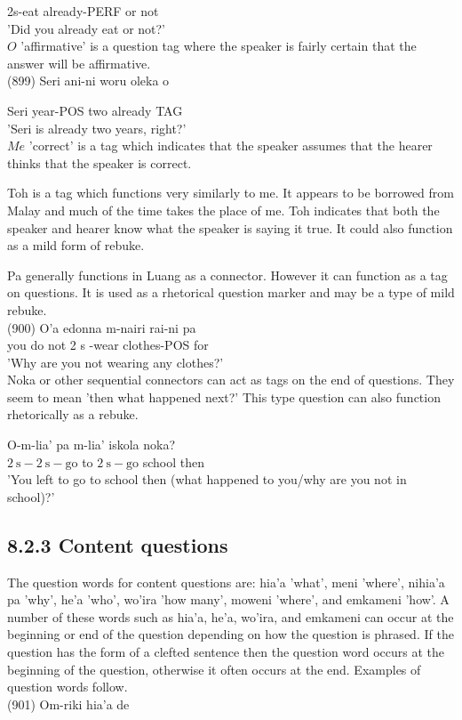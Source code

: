 \documentclass[10pt]{article}
\begin{document}
2s-eat already-PERF or not\\
'Did you already eat or not?'\\
\(O\) 'affirmative' is a question tag where the speaker is fairly certain that the answer will be affirmative.\\
(899) Seri ani-ni woru oleka o

Seri year-POS two already TAG\\
'Seri is already two years, right?'\\
\(M e\) 'correct' is a tag which indicates that the speaker assumes that the hearer thinks that the speaker is correct.

Toh is a tag which functions very similarly to me. It appears to be borrowed from Malay and much of the time takes the place of me. Toh indicates that both the speaker and hearer know what the speaker is saying it true. It could also function as a mild form of rebuke.

Pa generally functions in Luang as a connector. However it can function as a tag on questions. It is used as a rhetorical question marker and may be a type of mild rebuke.\\
(900) O’a edonna m-nairi rai-ni pa\\
you do not 2 s -wear clothes-POS for\\
'Why are you not wearing any clothes?'\\
Noka or other sequential connectors can act as tags on the end of questions. They seem to mean 'then what happened next?' This type question can also function rhetorically as a rebuke.

O-m-lia' pa m-lia' iskola noka?\\
\(2 \mathrm{~s}-2 \mathrm{~s}-\mathrm{go}\) to \(2 \mathrm{~s}-\mathrm{go}\) school then\\
'You left to go to school then (what happened to you/why are you not in school)?'

\subsection*{8.2.3 Content questions}
The question words for content questions are: hia'a 'what', meni 'where', nihia'a pa 'why', he'a 'who', wo'ira 'how many', moweni 'where', and emkameni 'how'. A number of these words such as hia'a, he'a, wo'ira, and emkameni can occur at the beginning or end of the question depending on how the question is phrased. If the question has the form of a clefted sentence then the question word occurs at the beginning of the question, otherwise it often occurs at the end. Examples of question words follow.\\
(901) Om-riki hia'a de
\end{document}
